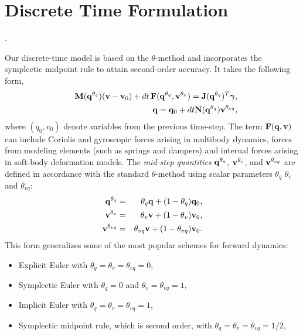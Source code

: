 \section{Discrete Time Formulation}
.

Our discrete-time model is based on the $\theta\text{-method}$ 
and incorporates the symplectic midpoint rule to attain second-order accuracy. 
It takes the following form, 
\begin{eqnarray}
	&&\mf{M}(\mf{q}^{\theta_{q}})(\mf{v}-\mf{v}_0) + 
	dt\,\mf{F}(\mf{q}^{\theta_{q}}, \mf{v}^{\theta_v}) = \mf{J}(\mf{q}^{\theta_{q}})^T\mf{\bgamma},
	\label{eq:v_update}\\
	&&\mf{q} = \mf{q}_0 + dt\mf{N}(\mf{q}^{\theta_{q}})\mf{v}^{\theta_{vq}},
	\label{eq:q_update}
\end{eqnarray}
where $(q_0, v_0)$ denote variables from the previous time-step.
The term ${\mathbf{F}}({\mathbf{q}}, {\mathbf{v}})$ can include Coriolis and gyroscopic
forces arising in multibody dynamics, forces from modeling elements (such as
springs and dampers) and internal forces arising in soft-body deformation models. 
The \emph{mid-step quantities} ${\mathbf{q}}^{\theta_{q}}$, ${\mathbf{v}}^{\theta_{v}}$,
and ${\mathbf{v}}^{\theta_{vq}}$ are defined in accordance with the standard
$\theta\text{-method}$ 
using scalar parameters $\theta_q$ $\theta_v$ and $\theta_{vq}$:
\begin{eqnarray*}
  {\mathbf{q}}^{\theta_q} &=& \theta_q{\mathbf{q}} + (1-\theta_{q}){\mathbf{q}}_0,\\
	{\mathbf{v}}^{\theta_v} &=& \theta_v{\mathbf{v}} + (1-\theta_v){\mathbf{v}}_0,\\
        {\mathbf{v}}^{\theta_{vq}} &=& \theta_{vq}{\mathbf{v}} + (1-\theta_{vq}){\mathbf{v}}_0.
\end{eqnarray*}
This form generalizes some of the most popular schemes for forward dynamics:
\begin{itemize}
	\item Explicit Euler with $\theta_q=\theta_{v}=\theta_{vq} = 0$,
	\item Symplectic Euler with $\theta_{q} = 0$ and $\theta_v = \theta_{vq}=1$,
	\item Implicit Euler with $\theta_{q} = \theta_v = \theta_{vq}= 1$,
	\item Symplectic midpoint rule, which is second order, with $\theta_{q} =
	\theta_v = \theta_{vq}= 1/2$,
\end{itemize}

